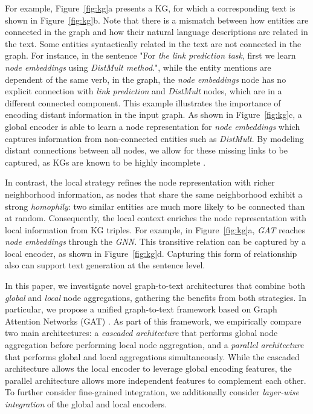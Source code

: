 \documentclass[11pt,a4paper]{article}
\begin{document}
For example, Figure~\ref{fig:kg}a presents a KG, for which a corresponding text is shown in Figure~\ref{fig:kg}b. Note that there is a mismatch between how entities are connected in the graph and how their natural language descriptions are related in the text. Some entities syntactically related in the text are not connected in the graph. For instance, in the sentence "For \textit{the link prediction task}, first we learn \textit{node embeddings} using \textit{DistMult method}.", while the entity mentions are dependent of the same verb, in the graph, the \textit{node embeddings} node has no explicit connection with \textit{link prediction} and \textit{DistMult} nodes, which are in a different connected component. This example illustrates the importance of encoding distant information in the input graph. As shown in Figure~\ref{fig:kg}c, a global encoder is able to learn a node representation for \textit{node embeddings} which captures information from non-connected entities such as \textit{DistMult}. By modeling distant connections between all nodes, we allow for these missing links to be captured, as KGs are known to be highly incomplete \cite{45634, Schlichtkrull2018ModelingRD}. 


In contrast, the local strategy refines the node representation with richer neighborhood information, as nodes that share the same neighborhood exhibit a strong \textit{homophily}: two similar entities are much more likely to be connected than at random. Consequently, the local context enriches the node representation with local information from KG triples. For example, in Figure~\ref{fig:kg}a, \textit{GAT} reaches \textit{node embeddings} through the \textit{GNN}. This transitive relation can be captured by a local encoder, as shown in Figure~\ref{fig:kg}d. Capturing this form of relationship also can support text generation at the sentence level.



In this paper, we investigate novel graph-to-text architectures that combine both \textit{global} and \textit{local} node aggregations, gathering the benefits from both strategies. In particular, we propose a unified graph-to-text framework based on Graph Attention Networks (GAT) \cite{velickovic2018graph}. As part of this framework, we empirically compare two main architectures: a \emph{cascaded architecture} that performs global node aggregation before performing local node aggregation, and a \emph{parallel architecture} that performs global and local aggregations simultaneously. While the cascaded architecture allows the local encoder to leverage global encoding features, the parallel architecture allows more independent features to complement each other. To further consider fine-grained integration, we additionally consider \emph{layer-wise integration} of the global and local encoders. 
\end{document}
